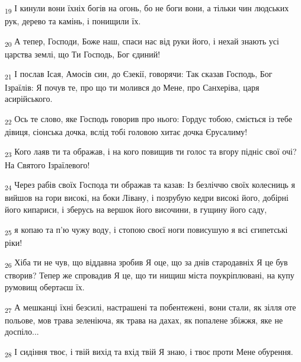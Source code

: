 \begin{tcolorbox}
\textsubscript{19} І кинули вони їхніх богів на огонь, бо не боги вони, а тільки чин людських рук, дерево та камінь, і понищили їх.
\end{tcolorbox}
\begin{tcolorbox}
\textsubscript{20} А тепер, Господи, Боже наш, спаси нас від руки його, і нехай знають усі царства землі, що Ти Господь, Бог єдиний!
\end{tcolorbox}
\begin{tcolorbox}
\textsubscript{21} І послав Ісая, Амосів син, до Єзекії, говорячи: Так сказав Господь, Бог Ізраїлів: Я почув те, про що ти молився до Мене, про Санхеріва, царя асирійського.
\end{tcolorbox}
\begin{tcolorbox}
\textsubscript{22} Ось те слово, яке Господь говорив про нього: Гордує тобою, сміється із тебе дівиця, сіонська дочка, вслід тобі головою хитає дочка Єрусалиму!
\end{tcolorbox}
\begin{tcolorbox}
\textsubscript{23} Кого лаяв ти та ображав, і на кого повищив ти голос та вгору підніс свої очі? На Святого Ізраїлевого!
\end{tcolorbox}
\begin{tcolorbox}
\textsubscript{24} Через рабів своїх Господа ти ображав та казав: Із безліччю своїх колесниць я вийшов на гори високі, на боки Лівану, і позрубую кедри високі його, добірні його кипариси, і зберусь на вершок його височини, в гущину його саду,
\end{tcolorbox}
\begin{tcolorbox}
\textsubscript{25} я копаю та п'ю чужу воду, і стопою своєї ноги повисушую я всі єгипетські ріки!
\end{tcolorbox}
\begin{tcolorbox}
\textsubscript{26} Хіба ти не чув, що віддавна зробив Я оце, що за днів стародавніх Я це був створив? Тепер же спровадив Я це, що ти нищиш міста поукріплювані, на купу румовищ обертаєш їх.
\end{tcolorbox}
\begin{tcolorbox}
\textsubscript{27} А мешканці їхні безсилі, настрашені та побентежені, вони стали, як зілля оте польове, мов трава зеленіюча, як трава на дахах, як попалене збіжжя, яке не доспіло...
\end{tcolorbox}
\begin{tcolorbox}
\textsubscript{28} І сидіння твоє, і твій вихід та вхід твій Я знаю, і твоє проти Мене обурення.
\end{tcolorbox}
